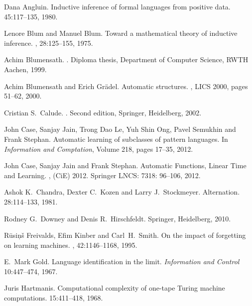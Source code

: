 \documentclass{LMCS}
\theoremstyle{plain}\newtheorem{athm}[thm]{Theorem}
\theoremstyle{plain}\newtheorem{aprop}[thm]{Proposition}
\theoremstyle{plain}\newtheorem{aprob}[thm]{Open Problem}
\theoremstyle{plain}\newtheorem{acor}[thm]{Corollary}
\theoremstyle{plain}\newtheorem{alem}[thm]{Lemma}
\theoremstyle{definition}\newtheorem{adefn}[thm]{Definition}
\theoremstyle{definition}\newtheorem{arem}[thm]{Remark}
\theoremstyle{plain}\newtheorem{aexmp}[thm]{Example}
\theoremstyle{plain}\newtheorem{aclm}[thm]{Claim}
\begin{document}
\begin{thebibliography}{10}

 Dana Angluin.
\newblock Inductive inference of formal languages from positive data.
 45:117--135, 1980.

 Lenore Blum and Manuel Blum.
\newblock Toward a mathematical theory of inductive inference.
, 28:125--155, 1975.

 Achim Blumensath.
.
\newblock Diploma thesis, Department of Computer Science, RWTH Aachen, 1999.

 Achim Blumensath and Erich Gr\"adel.
\newblock Automatic structures.
, LICS 2000,
pages 51--62, 2000. 

 Cristian S.\ Calude.
.
\newblock Second edition, Springer, Heidelberg, 2002.

 John Case, Sanjay Jain, Trong Dao Le, Yuh Shin Ong, Pavel
  Semukhin and Frank Stephan.
\newblock Automatic learning of subclasses of pattern languages.
\newblock In {\em Information and Comptation}, Volume 218, pages 17--35, 2012.

 John Case, Sanjay Jain and Frank Stephan.
\newblock Automatic Functions, Linear Time and Learning.
,
(CiE) 2012. Springer LNCS: 7318: 96--106, 2012.

 Ashok K.\ Chandra, Dexter C.\ Kozen and Larry J.\ Stockmeyer.
\newblock Alternation.
 28:114--133, 1981.

 Rodney G.\ Downey and Denis R.\ Hirschfeldt.
\newblock Springer, Heidelberg, 2010.

 R{\={u}}si{\c{n}}{\v{s}} Freivalds, Efim Kinber and 
Carl~H.~Smith.
\newblock On the impact of forgetting on learning machines.
, 42:1146--1168, 1995.

 E.~Mark Gold.
\newblock Language identification in the limit.
\newblock\emph{Information and Control} 10:447--474, 1967.

 Juris Hartmanis.
\newblock Computational complexity of one-tape Turing machine computations.
  15:411--418, 1968.


\end{thebibliography}
\end{document}

